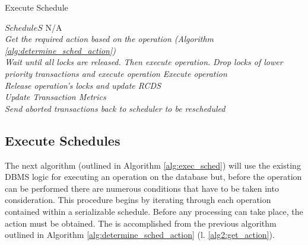 \documentclass[conference]{IEEEtran}
\begin{document}
\begin{algorithm}
\caption{Execute Schedule}
\label{alg:exec_sched}
\begin{algorithmic}[1]
\Require $Schedule S$
\Ensure N/A
    \\
        \State \textit{Get the required action based on}
        \State \textit{the operation (Algorithm \ref{alg:determine_sched_action})} \label{alg2:get_action}
        \\
         \label{alg2:decline_action}
            \State \textit{Wait until all locks are released.}
            \State \textit{Then execute operation.}
        \label{alg2:elev_action}
            \State \textit{Drop locks of lower priority }
            \State \textit{transactions and execute operation}
        \label{alg2:grant_action}
            \State \textit{Execute operation}
        \EndIf
        \\
        \State \textit{Release operation's locks and update RCDS}
    \EndFor
    \\
    \State \textit{Update Transaction Metrics}\label{alg2:update_metrics}
    \\
    \State \textit{Send aborted transactions back to}
    \State \textit{scheduler to be rescheduled}\label{alg2:abort}
\EndProcedure

\end{algorithmic}
\end{algorithm}

\subsection{Execute Schedules}

The next algorithm (outlined in Algorithm \ref{alg:exec_sched}) will use the existing DBMS logic for executing an operation on the database but, before the operation can be performed there are numerous conditions that have to be taken into consideration. This procedure begins by iterating through each operation contained within a serializable schedule. Before any processing can take place, the action must be obtained. The is accomplished from the previous algorithm outlined in Algorithm \ref{alg:determine_sched_action} (l. \ref{alg2:get_action}).
\end{document}
